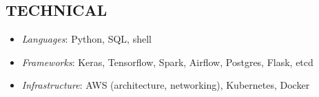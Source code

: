 \documentclass[geomargin]{res}
\begin{document}
\begin{resume}
%


\section{TECHNICAL}

\begin{itemize}
  \item \textit{Languages}: Python, SQL, shell
  \item \textit{Frameworks}: Keras, Tensorflow, Spark, Airflow, Postgres, Flask, etcd
  \item \textit{Infrastructure}: AWS (architecture, networking), Kubernetes, Docker
\end{itemize}



\end{resume}
\end{document}
